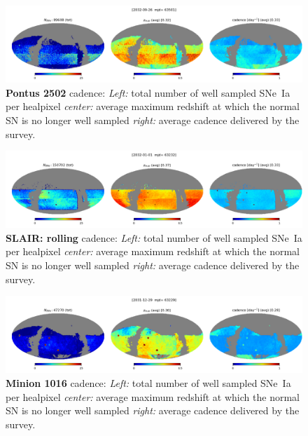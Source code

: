 \begin{figure}[h!]
  \begin{center}
    \includegraphics[width=\linewidth]{Figures/pontus_2502_64_maps.png}
    \caption{{\bf Pontus 2502} cadence: {\em Left:} total number of well
      sampled SNe~Ia per healpixel {\em center:} average maximum
      redshift at which the normal SN is no longer well sampled {\em
        right:} average cadence delivered by the survey.}
    \label{fig:pontus_2502}
  \end{center}
\end{figure}

\begin{figure}[h!]
  \begin{center}
    \includegraphics[width=\linewidth]{Figures/rolling_10yrs_64_maps.png}
    \caption{{\bf SLAIR: rolling} cadence: {\em Left:} total number of well
      sampled SNe~Ia per healpixel {\em center:} average maximum
      redshift at which the normal SN is no longer well sampled {\em
        right:} average cadence delivered by the survey.}
    \label{fig:slair_rolling}
  \end{center}
\end{figure}

\begin{figure}[h!]
  \begin{center}
    \includegraphics[width=\linewidth]{Figures/minion_1016_64_maps.png}
    \caption{{\bf Minion 1016} cadence: {\em Left:} total number of well
      sampled SNe~Ia per healpixel {\em center:} average maximum
      redshift at which the normal SN is no longer well sampled {\em
        right:} average cadence delivered by the survey.}
    \label{fig:minion_1016}
  \end{center}
\end{figure}

